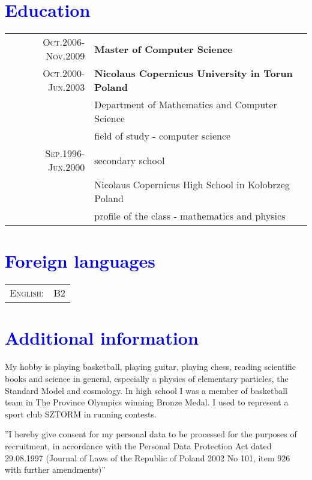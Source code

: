 \documentclass[a4paper,12pt]{article}
\begin{document}
\section{\textcolor{Blue}{Education}}
\begin{tabular}{r|p{11cm}}
	\textsc{Oct.2006-Nov.2009}
		&  \textbf{Master of Computer Science}\\
	\textsc{Oct.2000-Jun.2003}
		&  \textbf{Nicolaus Copernicus University in Torun Poland}\\
		& Department of Mathematics and Computer Science\\
		& field of study - computer science\\

	\textsc{Sep.1996-Jun.2000}
		& secondary school\\
		& Nicolaus Copernicus High School in Kolobrzeg Poland\\
		& profile of the class - mathematics and physics\\
\end{tabular}

\section{\textcolor{Blue}{Foreign languages}}
\begin{tabular}{r|p{11cm}}
	\textsc{English:}&B2\\
\end{tabular}

\section{\textcolor{Blue}{Additional information}}
	My hobby is playing basketball, playing guitar, playing chess, reading scientific books and science in general, especially a
	physics of elementary particles, the Standard Model and cosmology. In high school I was a member of basketball
	team in The Province Olympics winning Bronze Medal. I used to represent a sport club SZTORM in running contests.
\vfill{}

\begin{center}
{\scriptsize
	''I hereby give consent for my personal data to be processed for the purposes of recruitment,
	in accordance with the Personal Data Protection Act dated 29.08.1997
	(Journal of Laws of the Republic of Poland 2002 No 101, item 926 with further amendments)''}
\end{center}
\end{document}
